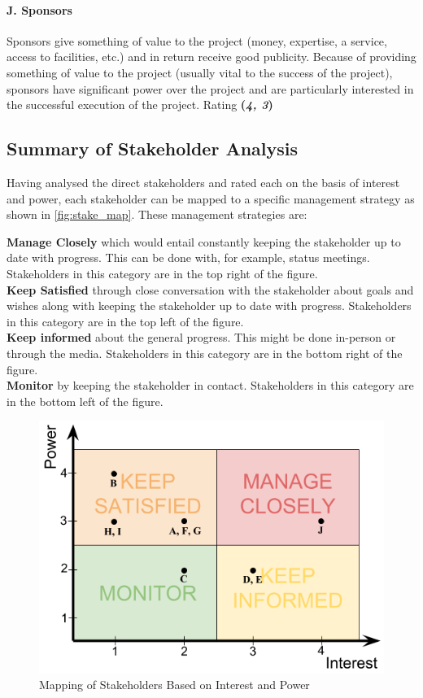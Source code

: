 \paragraph{J. Sponsors}
Sponsors give something of value to the project (money, expertise, a service, access to facilities, etc.) and in return receive good publicity. Because of providing something of value to the project (usually vital to the success of the project), sponsors have significant power over the project and are particularly interested in the successful execution of the project. Rating \textbf{(\textit{4, 3})} 

\subsection{Summary of Stakeholder Analysis}
Having analysed the direct stakeholders and rated each on the basis of interest and power, each stakeholder can be mapped to a specific management strategy as shown in \autoref{fig:stake_map}. These management strategies are:

\indent \textbf{Manage Closely} which would entail constantly keeping the stakeholder up to date with progress. This can be done with, for example, status meetings. Stakeholders in this category are in the top right of the figure.\\
\indent \textbf{Keep Satisfied} through close conversation with the stakeholder about goals and wishes along with keeping the stakeholder up to date with progress. Stakeholders in this category are in the top left of the figure.\\
\indent \textbf{Keep informed} about the general progress. This might be done in-person or through the media. Stakeholders in this category are in the bottom right of the figure.\\
\indent \textbf{Monitor} by keeping the stakeholder in contact. Stakeholders in this category are in the bottom left of the figure.


\begin{figure}[h]
    \centering
    \includegraphics[scale=0.5]{MarketStakeholderAnalysis/Figures/Stakeholder_mapping}
    \caption{Mapping of Stakeholders Based on Interest and Power}
    \label{fig:stake_map}
\end{figure}